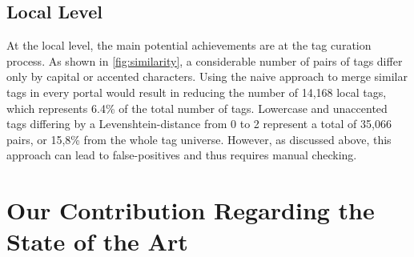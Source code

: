 

\subsection{Local Level}

At the local level, the main potential achievements are at the tag curation process.
As shown in \autoref{fig:similarity}, a considerable number of pairs of tags differ only by capital or accented characters.
Using the naive approach to merge similar tags in every portal would result in reducing the number of 14,168 local tags, which represents 6.4\% of the total number of tags.
Lowercase and unaccented tags differing by a Levenshtein-distance from 0 to 2 represent a total of 35,066 pairs, or 15,8\% from the whole tag universe.
However, as discussed above, this approach can lead to false-positives and thus requires manual checking.


\section{Our Contribution Regarding the State of the Art}

